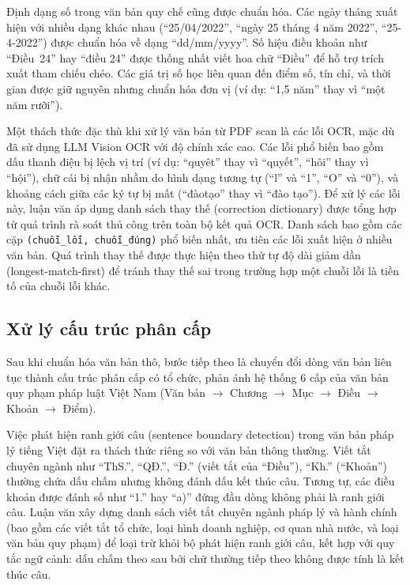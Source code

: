 Định dạng số trong văn bản quy chế cũng được chuẩn hóa. Các ngày tháng xuất
hiện với nhiều dạng khác nhau (``25/04/2022'', ``ngày 25 tháng 4 năm 2022'',
``25-4-2022'') được chuẩn hóa về dạng ``dd/mm/yyyy''. Số hiệu điều khoản như
``Điều~24'' hay ``điều 24'' được thống nhất viết hoa chữ ``Điều'' để hỗ trợ
trích xuất tham chiếu chéo. Các giá trị số học liên quan đến điểm số, tín chỉ,
và thời gian được giữ nguyên nhưng chuẩn hóa đơn vị (ví dụ: ``1,5 năm'' thay
vì ``một năm rưỡi'').

Một thách thức đặc thù khi xử lý văn bản từ PDF scan là các lỗi OCR, mặc dù đã
sử dụng LLM Vision OCR với độ chính xác cao. Các lỗi phổ biến bao gồm dấu thanh
điệu bị lệch vị trí (ví dụ: ``quyêt'' thay vì ``quyết'', ``hôi'' thay vì
``hội''), chữ cái bị nhận nhầm do hình dạng tương tự (``l'' và ``1'', ``O'' và
``0''), và khoảng cách giữa các ký tự bị mất (``đàotạo'' thay vì ``đào tạo'').
Để xử lý các lỗi này, luận văn áp dụng danh sách thay thế (correction dictionary)
được tổng hợp từ quá trình rà soát thủ công trên toàn bộ kết quả OCR. Danh sách
bao gồm các cặp \texttt{(chuỗi\_lỗi, chuỗi\_đúng)} phổ biến nhất, ưu tiên các lỗi
xuất hiện ở nhiều văn bản. Quá trình thay thế được thực hiện theo thứ tự độ dài
giảm dần (longest-match-first) để tránh thay thế sai trong trường hợp một chuỗi
lỗi là tiền tố của chuỗi lỗi khác.

\subsection{Xử lý cấu trúc phân cấp}
\label{subsec:xu-ly-cau-truc}

Sau khi chuẩn hóa văn bản thô, bước tiếp theo là chuyển đổi dòng văn bản liên
tục thành cấu trúc phân cấp có tổ chức, phản ánh hệ thống 6 cấp của văn bản
quy phạm pháp luật Việt Nam (Văn bản $\rightarrow$ Chương $\rightarrow$ Mục
$\rightarrow$ Điều $\rightarrow$ Khoản $\rightarrow$ Điểm).

Việc phát hiện ranh giới câu (sentence boundary detection) trong văn bản pháp lý
tiếng Việt đặt ra thách thức riêng so với văn bản thông thường. Viết tắt chuyên
ngành như ``ThS.'', ``QĐ.'', ``Đ.'' (viết tắt của ``Điều''), ``Kh.'' (``Khoản'')
thường chứa dấu chấm nhưng không đánh dấu kết thúc câu. Tương tự, các điều
khoản được đánh số như ``1.'' hay ``a)'' đứng đầu dòng không phải là ranh giới
câu. Luận văn xây dựng danh sách viết tắt chuyên ngành pháp lý và hành chính (bao gồm
các viết tắt tổ chức, loại hình doanh nghiệp, cơ quan nhà nước, và loại văn bản
quy phạm) để loại trừ khỏi bộ phát hiện ranh giới câu, kết hợp với quy tắc ngữ
cảnh: dấu chấm theo sau bởi chữ thường tiếp theo không được tính là kết thúc câu.

